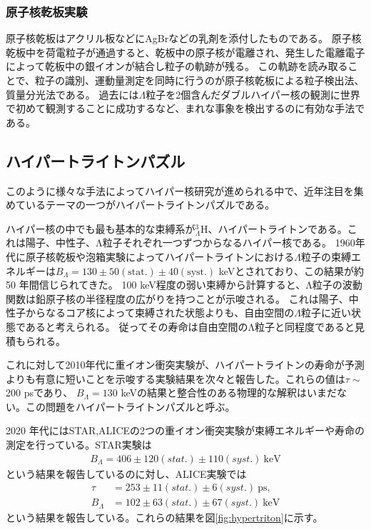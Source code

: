 \documentclass[a4paper,11pt,uplatex]{jsbook}
\begin{document}
\subsubsection{原子核乾板実験}
原子核乾板はアクリル板などにAgBrなどの乳剤を添付したものである。
原子核乾板中を荷電粒子が通過すると、乾板中の原子核が電離され、発生した電離電子によって乾板中の銀イオンが結合し粒子の軌跡が残る。
この軌跡を読み取ることで、粒子の識別、運動量測定を同時に行うのが原子核乾板による粒子検出法、質量分光法である。
過去には$\Lambda$粒子を2個含んだダブルハイパー核の観測に世界で初めて観測することに成功するなど\cite{takahashi2001}、まれな事象を検出するのに有効な手法である。

\subsection{ハイパートライトンパズル}\label{sec:hypertriton puzzle}
このように様々な手法によってハイパー核研究が進められる中で、近年注目を集めているテーマの一つがハイパートライトンパズルである。

ハイパー核の中でも最も基本的な束縛系が$^3_{\Lambda}\text{H}$、ハイパートライトンである。これは陽子、中性子、Λ粒子それぞれ一つずつからなるハイパー核である。
1960年代に原子核乾板や泡箱実験によってハイパートライトンにおける$\Lambda$粒子の束縛エネルギーは$B_{\Lambda} = 130 \pm 50(\text{stat.}) \pm 40(\text{syst.})$ keVとされており\cite{Juric}、この結果が約50 年間信じられてきた。
100 keV程度の弱い束縛から計算すると、Λ粒子の波動関数は鉛原子核の半径程度の広がりを持つことが示唆される。
これは陽子、中性子からなるコア核によって束縛された状態よりも、自由空間の$\Lambda$粒子に近い状態であると考えられる。%
従ってその寿命は自由空間のΛ粒子と同程度であると見積もられる。

これに対して2010年代に重イオン衝突実験が、ハイパートライトンの寿命が予測よりも有意に短いことを示唆する実験結果を次々と報告した\cite{HI-1,HI-2,HI-3,HI-4}。これらの値は$\tau \sim$200 psであり、
$B_{\Lambda} = 130$ keVの結果と整合性のある物理的な解釈はいまだない。この問題をハイパートライトンパズルと呼ぶ。

2020 年代にはSTAR,ALICEの2つの重イオン衝突実験が束縛エネルギーや寿命の測定を行っている。STAR実験\cite{STAR}は
\begin{align*}
  B_{\Lambda} = 406 \pm 120(stat.) \pm 110 (syst.) ~\text{keV}
\end{align*}
という結果を報告しているのに対し、ALICE実験\cite{ALICE}では
\begin{align*}
  \tau        &= 253 \pm 11(stat.) \pm 6(syst.) ~\text{ps},\\
  B_{\Lambda} &= 102 \pm 63(stat.) \pm 67(syst.) ~\text{keV}
\end{align*}
という結果を報告している。これらの結果を図\ref{fig:hypertriton}に示す。
\end{document}
